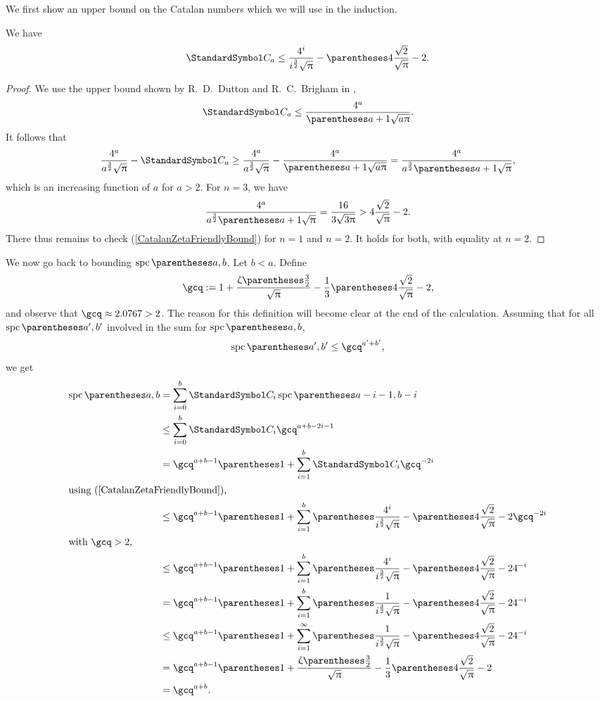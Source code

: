 We first show an upper bound on the Catalan numbers which we will use in the induction.
\begin{remark}
We have\begin{equation}
\CatalanNumber a \leq \frac{4^i}{i^{\frac 3 2}\sqrt{\Pi}}-\pa{4\frac {\sqrt 2} {\sqrt \Pi}-2} \text.\label{CatalanZetaFriendlyBound}
\end{equation}
\begin{proof}
We use the upper bound shown by R.~D.~Dutton and R.~C.~Brigham in \cite{DuttonBrigham1986},\[
\CatalanNumber a\leq \frac{4^a}{\pa{a+1}\sqrt{a\Pi}}\text.
\]
It follows that\[
\frac{4^a}{a^{\frac 3 2}\sqrt{\Pi}} - \CatalanNumber a \geq \frac{4^a}{a^{\frac 3 2}\sqrt{\Pi}} - \frac{4^a}{\pa{a+1}\sqrt{a\Pi}} = \frac{4^a}{a^{\frac 3 2}\pa{a+1}\sqrt{\Pi}}\text,
\]
which is an increasing function of $a$ for $a>2$. For $n=3$, we have\[
\frac{4^a}{a^{\frac 3 2}\pa{a+1}\sqrt{\Pi}}=\frac{16}{3\sqrt{3\Pi}}>4\frac {\sqrt 2} {\sqrt \Pi}-2\text.
\]
There thus remains to check (\ref{CatalanZetaFriendlyBound}) for $n=1$ and $n=2$. It holds for both, with equality at $n=2$.
\end{proof}
\end{remark}
We now go back to bounding $\spc\of{a,b}$.
Let $b<a$. Define\[
\gcq\DefineAs 1+\frac{\RiemannZeta\of{\frac 3 2}}{\sqrt{\Pi}}-\frac{1}{3}\pa{4\frac {\sqrt 2} {\sqrt \Pi}-2}\text,
\]
and observe that $\gcq\approx 2.0767 > 2$. The reason for this definition will become clear at the end of the calculation.
Assuming that for all $\spc\of{a',b'}$ involved in the sum
for $\spc\of{a,b}$,\[
\spc\of{a',b'}\leq\gcq^{a'+b'}\text,
\]
we get\begin{align*}
\spc\of{a,b} &= \sum{i=0}[b] \CatalanNumber {i} \spc\of{a-i-1,b-i} \\
 &\leq \sum{i=0}[b] \CatalanNumber {i} \gcq^{a+b-2i-1} \\
 &= \gcq^{a+b-1}\pa{1+\sum{i=1}[b] \CatalanNumber {i} \gcq^{-2i}}\\
\intertext{using (\ref{CatalanZetaFriendlyBound}),}
 &\leq \gcq^{a+b-1}\pa{1+\sum{i=1}[b] \pa{\frac{4^i}{i^{\frac 3 2}\sqrt{\Pi}}-\pa{4\frac {\sqrt 2} {\sqrt \Pi}-2}} \gcq^{-2i}} \\
\intertext{with $\gcq > 2$,}
 &\leq \gcq^{a+b-1}\pa{1+\sum{i=1}[b] \pa{\frac{4^i}{i^{\frac 3 2}\sqrt{\Pi}}-\pa{4\frac {\sqrt 2} {\sqrt \Pi}-2}} 4^{-i}} \\
 &= \gcq^{a+b-1}\pa{1+\sum{i=1}[b] \pa{\frac{1}{i^{\frac 3 2}\sqrt{\Pi}}-\pa{4\frac {\sqrt 2} {\sqrt \Pi}-2} 4^{-i}}} \\
 &\leq \gcq^{a+b-1}\pa{1+\sum{i=1}[\infty] \pa{\frac{1}{i^{\frac 3 2}\sqrt{\Pi}}-\pa{4\frac {\sqrt 2} {\sqrt \Pi}-2} 4^{-i}}} \\
 &= \gcq^{a+b-1}\pa{1+\frac{\RiemannZeta\of{\frac 3 2}}{\sqrt{\Pi}}-\frac{1}{3}\pa{4\frac {\sqrt 2} {\sqrt \Pi}-2}} \\
 &= \gcq^{a+b}\text.
\end{align*}
